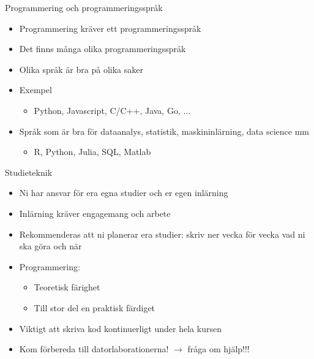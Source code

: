 \documentclass[
  10pt,
  ignorenonframetext,
]{beamer}
\providecommand{\tightlist}{%
  \setlength{\itemsep}{0pt}\setlength{\parskip}{0pt}}
\begin{document}

\begin{frame}{Programmering och programmeringsspråk}
\protect\hypertarget{varfuxf6r-luxe4ra-sig-programera}{}
\begin{itemize}[<+->]
\tightlist
\item
  Programmering kräver ett programmeringsspråk
\item
  Det finns många olika programmeringsspråk
\item
  Olika språk är bra på olika saker
\item
  Exempel
  \begin{itemize}
    \item Python, Javascript, C/C++, Java, Go, ...
  \end{itemize}
\item
  Språk som är bra för dataanalys, statistik, maskininlärning, data science mm
  \begin{itemize}
    \item R, Python, Julia, SQL, Matlab
  \end{itemize}
\end{itemize}
\end{frame}


\begin{frame}{Studieteknik}
\protect\hypertarget{datorlaborationer}{}
\begin{itemize}[<+->]
\tightlist
\item
  Ni har ansvar för era egna studier och er egen inlärning
\item
  Inlärning kräver engagemang och arbete
\item
  Rekommenderas att ni planerar era studier: skriv ner vecka för vecka vad ni ska göra och när
\item
  Programmering:
    \begin{itemize}
      \item Teoretisk färighet 
      \item Till stor del en praktisk färdiget
    \end{itemize}
\item Viktigt att skriva kod kontinuerligt under hela kursen
\item Kom förbereda till datorlaborationerna! $\rightarrow$ fråga om hjälp!!!
\end{itemize}
\end{frame}


\end{document}
